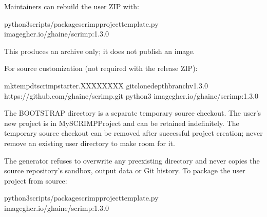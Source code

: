 \documentclass[letterpaper,10pt,english]{sphinxmanual}
\begin{document}
\sphinxAtStartPar
Maintainers can rebuild the user ZIP with:

\begin{sphinxVerbatim}[commandchars=\\\{\}]
python3scripts/package\PYGZhy{}scrimp\PYGZhy{}project\PYGZhy{}template.py
\PYGZhy{}\PYGZhy{}imageghcr.io/g\PYGZhy{}haine/scrimp:1.3.0
\end{sphinxVerbatim}

\sphinxAtStartPar
This produces an archive only; it does not publish an image.

\sphinxAtStartPar
For source customization (not required with the release ZIP):

\begin{sphinxVerbatim}[commandchars=\\\{\}]
mktemp\PYGZhy{}d\PYGZhy{}tscrimp\PYGZhy{}starter.XXXXXXXX
gitclone\PYGZhy{}\PYGZhy{}depth\PYGZhy{}\PYGZhy{}branchv1.3.0
https://github.com/g\PYGZhy{}haine/scrimp.git
python3
\PYGZhy{}\PYGZhy{}imageghcr.io/g\PYGZhy{}haine/scrimp:1.3.0
\end{sphinxVerbatim}

\sphinxAtStartPar
The BOOTSTRAP directory is a separate  temporary
source checkout. The user’s new project is in MySCRIMPProject and
can be retained indefinitely. The temporary source checkout can
be removed after successful project creation; never remove an
existing user directory to make room for it.

\sphinxAtStartPar
The generator refuses to overwrite any pre\sphinxhyphen{}existing directory and
never copies the source repository’s sandbox, output data or Git history.
To package the user project from source:

\begin{sphinxVerbatim}[commandchars=\\\{\}]
python3scripts/package\PYGZhy{}scrimp\PYGZhy{}project\PYGZhy{}template.py
\PYGZhy{}\PYGZhy{}imageghcr.io/g\PYGZhy{}haine/scrimp:1.3.0
\end{sphinxVerbatim}
\end{document}
